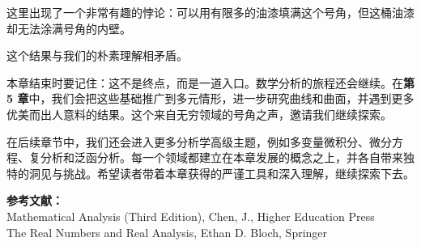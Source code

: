 这里出现了一个非常有趣的悖论：可以用有限多的油漆填满这个号角，但这桶油漆却无法涂满号角的内壁。

这个结果与我们的朴素理解相矛盾。

本章结束时要记住：这不是终点，而是一道入口。数学分析的旅程还会继续。在\textbf{第 5 章}中，我们会把这些基础推广到多元情形，进一步研究曲线和曲面，并遇到更多优美而出人意料的结果。这个来自无穷领域的号角之声，邀请我们继续探索。

在后续章节中，我们还会进入更多分析学高级主题，例如多变量微积分、微分方程、复分析和泛函分析。每一个领域都建立在本章发展的概念之上，并各自带来独特的洞见与挑战。希望读者带着本章获得的严谨工具和深入理解，继续探索下去。

\vspace{1cm}
\noindent
\textbf{参考文献：} \\
Mathematical Analysis (Third Edition), Chen, J., Higher Education Press \\
The Real Numbers and Real Analysis, Ethan D. Bloch, Springer

\cleardoublepage
